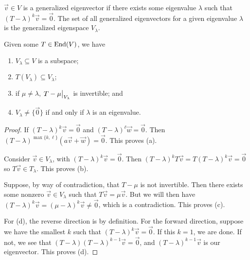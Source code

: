 \begin{definition}
    \(\vec{v} \in V\) is a generalized eigenvector
    if there exists some eigenvalue \(\lambda\) such that \({(T-\lambda)}^k\vec{v} = \vec{0}\).
    The set of all generalized eigenvectors for a given eigenvalue \(\lambda\)
    is the generalized eigenspace \(V_\lambda\).
\end{definition}
\begin{proposition}\label{prop:eigenspace-properties}
    Given some \(T \in \operatorname{End}(V)\), we have
    \begin{enumerate}[label={(\alph*)}, itemsep=0mm]
        \item \(V_\lambda \subseteq V\) is a subspace;
        \item \(T(V_\lambda) \subseteq V_\lambda\);
        \item if \(\mu \neq \lambda\), \(\eval{T-\mu}_{V_\lambda}\) is invertible; and
        \item \(V_\lambda \neq \{\vec{0}\}\) if and only if \(\lambda\) is an eigenvalue.
    \end{enumerate}
\end{proposition}
\begin{proof}
    If \({(T-\lambda)}^k\vec{v} = \vec{0}\) and \({(T-\lambda)}^\ell\vec{w} = \vec{0}\).
    Then \({(T-\lambda)}^{\max\{k,\ell\}}(a\vec{v}+\vec{w}) = \vec{0}\).
    This proves (a).

    Consider \(\vec{v} \in V_\lambda\), with \({(T-\lambda)}^k\vec{v} = \vec{0}\).
    Then \({(T-\lambda)}^k T\vec{v} = T{(T-\lambda)}^k\vec{v} = \vec{0}\)
    so \(T\vec{v} \in T_\lambda\).
    This proves (b).

    Suppose, by way of contradiction, that \(T-\mu\) is not invertible.
    Then there exists some nonzero \(\vec{v} \in V_\lambda\)
    such that \(T\vec{v} = \mu\vec{v}\).
    But we will then have \({(T-\lambda)}^k\vec{v} = {(\mu-\lambda)}^k\vec{v} \neq \vec{0}\),
    which is a contradiction.
    This proves (c).

    For (d), the reverse direction is by definition.
    For the forward direction,
    suppose we have the smallest \(k\) such that \({(T-\lambda)}^k\vec{v} = \vec{0}\).
    If this \(k = 1\), we are done.
    If not, we see that \((T-\lambda){(T-\lambda)}^{k-1}\vec{v} = \vec{0}\),
    and \({(T-\lambda)}^{k-1}\vec{v}\) is our eigenvector.
    This proves (d).
\end{proof}


